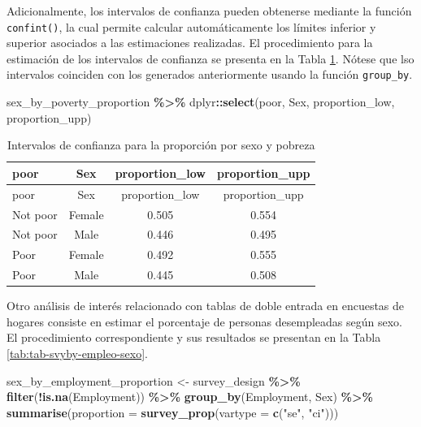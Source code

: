 \documentclass[
  spanish,
  12pt,
]{book}
\newenvironment{Shaded}{\begin{snugshade}}{\end{snugshade}}
\newcommand{\AttributeTok}[1]{\textcolor[rgb]{0.13,0.29,0.53}{#1}}
\newcommand{\FunctionTok}[1]{\textcolor[rgb]{0.13,0.29,0.53}{\textbf{#1}}}
\newcommand{\NormalTok}[1]{#1}
\newcommand{\OtherTok}[1]{\textcolor[rgb]{0.56,0.35,0.01}{#1}}
\newcommand{\SpecialCharTok}[1]{\textcolor[rgb]{0.81,0.36,0.00}{\textbf{#1}}}
\newcommand{\StringTok}[1]{\textcolor[rgb]{0.31,0.60,0.02}{#1}}
\begin{document}
Adicionalmente, los intervalos de confianza pueden obtenerse mediante la función \texttt{confint()}, la cual permite calcular automáticamente los límites inferior y superior asociados a las estimaciones realizadas. El procedimiento para la estimación de los intervalos de confianza se presenta en la Tabla \ref{tab:tab-confint-sexo-pobreza}. Nótese que lso intervalos coinciden con los generados anteriormente usando la función \texttt{group\_by}.

\begin{Shaded}
\begin{Highlighting}[]
\NormalTok{sex\_by\_poverty\_proportion }\SpecialCharTok{\%\textgreater{}\%}
\NormalTok{  dplyr}\SpecialCharTok{::}\FunctionTok{select}\NormalTok{(poor, Sex, proportion\_low, proportion\_upp)}
\end{Highlighting}
\end{Shaded}

\begin{longtable}[]{@{}lccc@{}}
\caption{\label{tab:tab-confint-sexo-pobreza}Intervalos de confianza para la proporción por sexo y pobreza}\tabularnewline
\toprule\noalign{}
poor & Sex & proportion\_low & proportion\_upp \\
\midrule\noalign{}
\endfirsthead
\toprule\noalign{}
poor & Sex & proportion\_low & proportion\_upp \\
\midrule\noalign{}
\endhead
\bottomrule\noalign{}
\endlastfoot
Not poor & Female & 0.505 & 0.554 \\
Not poor & Male & 0.446 & 0.495 \\
Poor & Female & 0.492 & 0.555 \\
Poor & Male & 0.445 & 0.508 \\
\end{longtable}

Otro análisis de interés relacionado con tablas de doble entrada en encuestas de hogares consiste en estimar el porcentaje de personas desempleadas según sexo. El procedimiento correspondiente y sus resultados se presentan en la Tabla \ref{tab:tab-svyby-empleo-sexo}.

\begin{Shaded}
\begin{Highlighting}[]
\NormalTok{sex\_by\_employment\_proportion }\OtherTok{\textless{}{-}}\NormalTok{ survey\_design }\SpecialCharTok{\%\textgreater{}\%}
  \FunctionTok{filter}\NormalTok{(}\SpecialCharTok{!}\FunctionTok{is.na}\NormalTok{(Employment)) }\SpecialCharTok{\%\textgreater{}\%}
  \FunctionTok{group\_by}\NormalTok{(Employment, Sex) }\SpecialCharTok{\%\textgreater{}\%}
  \FunctionTok{summarise}\NormalTok{(}\AttributeTok{proportion =} \FunctionTok{survey\_prop}\NormalTok{(}\AttributeTok{vartype =} \FunctionTok{c}\NormalTok{(}\StringTok{"se"}\NormalTok{, }\StringTok{"ci"}\NormalTok{)))}
\end{Highlighting}
\end{Shaded}
\end{document}
